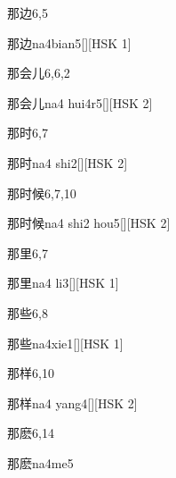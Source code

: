 \begin{entry}{那边}{6,5}
  \begin{phonetics}{那边}{na4bian5}[][HSK 1]
  \end{phonetics}
\end{entry}

\begin{entry}{那会儿}{6,6,2}
  \begin{phonetics}{那会儿}{na4 hui4r5}[][HSK 2]
  \end{phonetics}
\end{entry}

\begin{entry}{那时}{6,7}
  \begin{phonetics}{那时}{na4 shi2}[][HSK 2]
  \end{phonetics}
\end{entry}

\begin{entry}{那时候}{6,7,10}
  \begin{phonetics}{那时候}{na4 shi2 hou5}[][HSK 2]
  \end{phonetics}
\end{entry}

\begin{entry}{那里}{6,7}
  \begin{phonetics}{那里}{na4 li3}[][HSK 1]
  \end{phonetics}
\end{entry}

\begin{entry}{那些}{6,8}
  \begin{phonetics}{那些}{na4xie1}[][HSK 1]
  \end{phonetics}
\end{entry}

\begin{entry}{那样}{6,10}
  \begin{phonetics}{那样}{na4 yang4}[][HSK 2]
  \end{phonetics}
\end{entry}

\begin{entry}{那麽}{6,14}
  \begin{phonetics}{那麽}{na4me5}
  \end{phonetics}
\end{entry}

